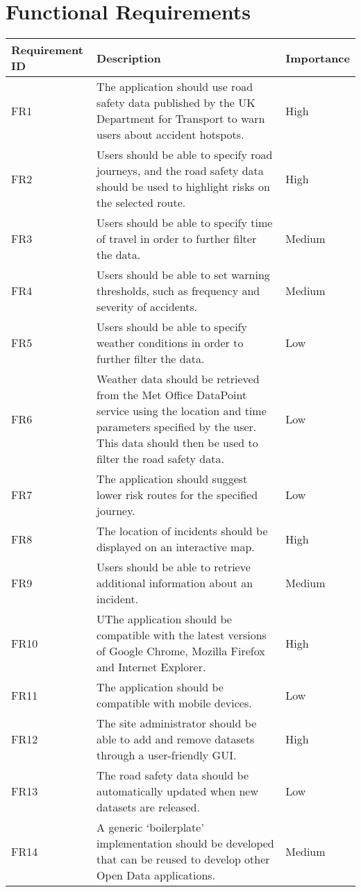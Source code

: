 \documentclass[authoryearcitations]{UoYCSproject}
\begin{document}
\section{Functional Requirements}

\begin{tabular}{| p{2.2cm} | p{7.5cm} | p{2cm} |}
	\hline
	\textbf{Requirement ID} & \textbf{Description} & \textbf{Importance} \\ \hline
	FR1 & The application should use road safety data published by the UK Department for Transport to warn users about accident hotspots. & High \\ \hline
	FR2 & Users should be able to specify road journeys, and the road safety data should be used to highlight risks on the selected route. & High \\ \hline
	FR3 & Users should be able to specify time of travel in order to further filter the data. & Medium \\ \hline
	FR4 & Users should be able to set warning thresholds, such as frequency and severity of accidents. & Medium \\ \hline
	FR5 & Users should be able to specify weather conditions in order to further filter the data. & Low \\ \hline
	FR6 & Weather data should be retrieved from the Met Office DataPoint service using the location and time parameters specified by the user. This data should then be used to filter the road safety data. & Low \\ \hline
	FR7 & The application should suggest lower risk routes for the specified journey. & Low \\ \hline
	FR8 & The location of incidents should be displayed on an interactive map. & High \\ \hline
	FR9 & Users should be able to retrieve additional information about an incident. & Medium \\ \hline
	FR10 & UThe application should be compatible with the latest versions of Google Chrome, Mozilla Firefox and Internet Explorer. & High \\ \hline
	FR11 & The application should be compatible with mobile devices. & Low \\ \hline
	FR12 & The site administrator should be able to add and remove datasets through a user-friendly GUI. & High \\ \hline
	FR13 & The road safety data should be automatically updated when new datasets are released. & Low \\ \hline
	FR14 & A generic ‘boilerplate’ implementation should be developed that can be reused to develop other Open Data applications. & Medium \\
	\hline
\end{tabular}
\end{document}
